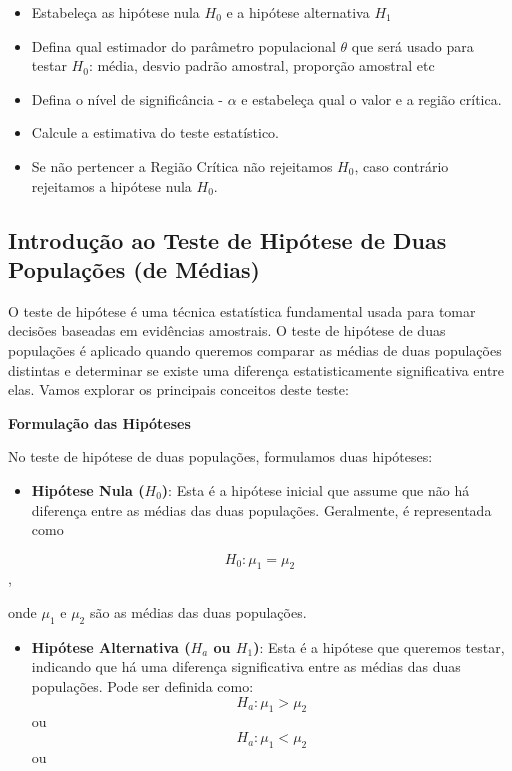 \documentclass[
  letterpaper,
  DIV=11,
  numbers=noendperiod]{scrreprt}
\providecommand{\tightlist}{%
  \setlength{\itemsep}{0pt}\setlength{\parskip}{0pt}}
\begin{document}
\begin{itemize}
\tightlist
\item
  Estabeleça as hipótese nula \(H_0\) e a hipótese alternativa \(H_1\)
\item
  Defina qual estimador do parâmetro populacional \(\theta\) que será
  usado para testar \(H_0\): média, desvio padrão amostral, proporção
  amostral etc
\item
  Defina o nível de significância - \(\alpha\) e estabeleça qual o valor
  e a região crítica.
\item
  Calcule a estimativa do teste estatístico.
\item
  Se não pertencer a Região Crítica não rejeitamos \(H_0\), caso
  contrário rejeitamos a hipótese nula \(H_0\).
\end{itemize}

\subsection{Introdução ao Teste de Hipótese de Duas Populações (de
Médias)}\label{introduuxe7uxe3o-ao-teste-de-hipuxf3tese-de-duas-populauxe7uxf5es-de-muxe9dias}

O teste de hipótese é uma técnica estatística fundamental usada para
tomar decisões baseadas em evidências amostrais. O teste de hipótese de
duas populações é aplicado quando queremos comparar as médias de duas
populações distintas e determinar se existe uma diferença
estatisticamente significativa entre elas. Vamos explorar os principais
conceitos deste teste:

\textbf{Formulação das Hipóteses}

No teste de hipótese de duas populações, formulamos duas hipóteses:

\begin{itemize}
\tightlist
\item
  \textbf{Hipótese Nula (\(H_0\))}: Esta é a hipótese inicial que assume
  que não há diferença entre as médias das duas populações. Geralmente,
  é representada como
\end{itemize}

\[H_0: \mu_1 = \mu_2\],

onde \(\mu_1\) e \(\mu_2\) são as médias das duas populações.

\begin{itemize}
\tightlist
\item
  \textbf{Hipótese Alternativa (\(H_a\) ou \(H_1\))}: Esta é a hipótese
  que queremos testar, indicando que há uma diferença significativa
  entre as médias das duas populações. Pode ser definida como:
  \[H_a: \mu_1 > \mu_2\] ou \[H_a: \mu_1 < \mu_2\] ou
\end{itemize}
\end{document}
